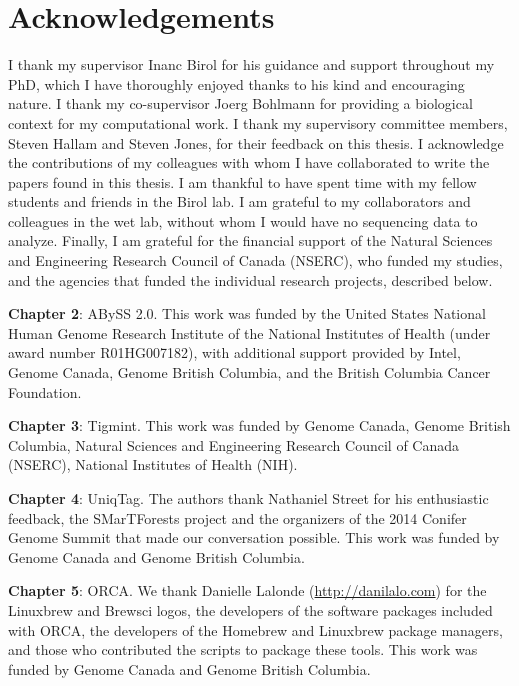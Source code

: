 \documentclass[
  12pt,
  oneside,
  openany]{book}
\begin{document}
\newpage

\hypertarget{acknowledgements}{%
\section*{Acknowledgements}\label{acknowledgements}}

I thank my supervisor Inanc Birol for his guidance and support throughout my PhD, which I have thoroughly enjoyed thanks to his kind and encouraging nature. I thank my co-supervisor Joerg Bohlmann for providing a biological context for my computational work. I thank my supervisory committee members, Steven Hallam and Steven Jones, for their feedback on this thesis. I acknowledge the contributions of my colleagues with whom I have collaborated to write the papers found in this thesis. I am thankful to have spent time with my fellow students and friends in the Birol lab. I am grateful to my collaborators and colleagues in the wet lab, without whom I would have no sequencing data to analyze. Finally, I am grateful for the financial support of the Natural Sciences and Engineering Research Council of Canada (NSERC), who funded my studies, and the agencies that funded the individual research projects, described below.

\textbf{Chapter 2}: ABySS 2.0. This work was funded by the United States National Human Genome Research Institute of the National Institutes of Health (under award number R01HG007182), with additional support provided by Intel, Genome Canada, Genome British Columbia, and the British Columbia Cancer Foundation.

\textbf{Chapter 3}: Tigmint. This work was funded by Genome Canada, Genome British Columbia, Natural Sciences and Engineering Research Council of Canada (NSERC), National Institutes of Health (NIH).

\textbf{Chapter 4}: UniqTag. The authors thank Nathaniel Street for his enthusiastic feedback, the SMarTForests project and the organizers of the 2014 Conifer Genome Summit that made our conversation possible. This work was funded by Genome Canada and Genome British Columbia.

\textbf{Chapter 5}: ORCA. We thank Danielle Lalonde (\url{http://danilalo.com}) for the Linuxbrew and Brewsci logos, the developers of the software packages included with ORCA, the developers of the Homebrew and Linuxbrew package managers, and those who contributed the scripts to package these tools. This work was funded by Genome Canada and Genome British Columbia.
\end{document}
